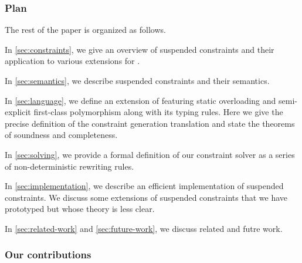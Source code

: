 \documentclass[acmsmall,screen,nonacm]{acmart}
\begin{document}
\subsubsection* {Plan}

The rest of the paper is organized as follows.
\begin{enumerate*}[label={}]
\item
  In \cref{sec:constraints}, we give an overview of suspended constraints
  and their application to various extensions for \ML.
\item
  In \cref{sec:semantics}, we describe suspended constraints and their semantics.
\item
  In \cref{sec:language}, we define an extension of \ML featuring static
  overloading and semi-explicit first-class polymorphism along with its
  typing rules. Here we give the precise definition of the constraint
  generation translation and state the theorems of soundness and
  completeness.
\item
  In \cref{sec:solving}, we provide a formal definition of our constraint
  solver as a series of non-deterministic rewriting rules.
\item In \cref{sec:implementation}, we describe an efficient implementation
  of suspended constraints. We discuss some extensions of suspended
  constraints that we have prototyped but whose theory is less clear.
\item
  In \cref{sec:related-work} and \cref{sec:future-work}, we discuss related
  and futre work.
\end{enumerate*}


\subsubsection* {Our contributions}
\end{document}
